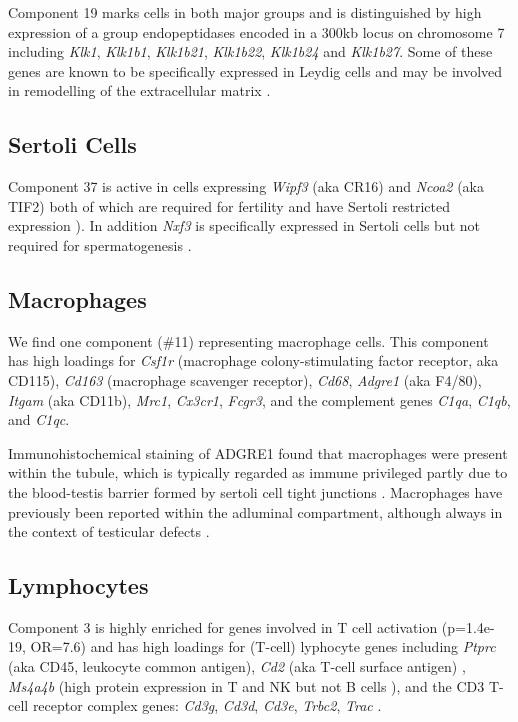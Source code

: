 Component 19 marks cells in both major groups and is distinguished by high expression of a group endopeptidases encoded in a 300kb locus on chromosome 7 including \textit{Klk1}, \textit{Klk1b1}, \textit{Klk1b21}, \textit{Klk1b22}, \textit{Klk1b24} and \textit{Klk1b27}. Some of these genes are known to be specifically expressed in Leydig cells and may be involved in remodelling of the extracellular matrix \parencite{Sanz2013RiboTag, Matsui2000Cloning, Matsui2001Mouse, Matsui2005Characterization}.

\subsection{Sertoli Cells}

Component 37 is active in cells expressing \textit{Wipf3} (aka CR16) and \textit{Ncoa2} (aka TIF2) both of which are required for fertility and have Sertoli restricted expression \cite{Suetsugu2007Malespecific, Gehin2002Function}). In addition \textit{Nxf3} is specifically expressed in Sertoli cells but not required for spermatogenesis \cite{Zhou2011Nxf3}.



\subsection{Macrophages}
We find one component (\#11) representing macrophage cells. This component has high loadings for \textit{Csf1r} (macrophage colony-stimulating factor receptor, aka CD115), \textit{Cd163} (macrophage scavenger receptor), \textit{Cd68}, \textit{Adgre1} (aka F4/80), \textit{Itgam} (aka CD11b), \textit{Mrc1}, \textit{Cx3cr1}, \textit{Fcgr3}, and the complement genes \textit{C1qa}, \textit{C1qb}, and \textit{C1qc}. \parencite{Mossadegh-Keller2017Developmental, Fabriek2005macrophage, Sasmono2012Generation}

Immunohistochemical staining of ADGRE1 found that macrophages were present within the tubule, which is typically regarded as immune privileged partly due to the blood-testis barrier formed by sertoli cell tight junctions \parencite{Fijak2006testis}. Macrophages have previously been reported within the adluminal compartment, although always in the context of testicular defects \parencite{Frungieri2002Number, Goluza2014Macrophages}.


\subsection{Lymphocytes}
Component 3 is highly enriched for genes involved in T cell activation (p=1.4e-19, OR=7.6) and has high loadings for (T-cell) lyphocyte genes including \textit{Ptprc} (aka CD45, leukocyte common antigen), \textit{Cd2} (aka T-cell surface antigen) \parencite{Murray2011Protective, Murphy2012Janeway}, \textit{Ms4a4b} (high protein expression in T and NK but not B cells \cite{Xu2010MS4a4B}), and the CD3 T-cell receptor complex genes: \textit{Cd3g}, \textit{Cd3d}, \textit{Cd3e}, \textit{Trbc2}, \textit{Trac} \parencite{Call2002Organizing}.


